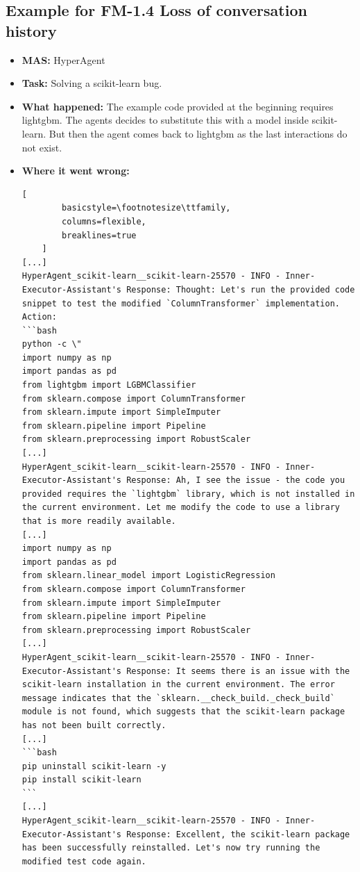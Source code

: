 \subsection{Example for FM-1.4 Loss of conversation history}\label{ex:fm2.3}
\begin{itemize}
    \item \textbf{MAS:} HyperAgent
    \item \textbf{Task:} Solving a scikit-learn bug. 
    \item \textbf{What happened:} The example code provided at the beginning requires lightgbm. The agents decides to substitute this with a model inside scikit-learn. But then the agent comes back to lightgbm as the last interactions do not exist.  
    \item \textbf{Where it went wrong:}
    \begin{lstlisting}[
        basicstyle=\footnotesize\ttfamily,
        columns=flexible,
        breaklines=true
    ]
[...]
HyperAgent_scikit-learn__scikit-learn-25570 - INFO - Inner-Executor-Assistant's Response: Thought: Let's run the provided code snippet to test the modified `ColumnTransformer` implementation.
Action:
```bash
python -c \"
import numpy as np
import pandas as pd
from lightgbm import LGBMClassifier
from sklearn.compose import ColumnTransformer
from sklearn.impute import SimpleImputer
from sklearn.pipeline import Pipeline
from sklearn.preprocessing import RobustScaler
[...]
HyperAgent_scikit-learn__scikit-learn-25570 - INFO - Inner-Executor-Assistant's Response: Ah, I see the issue - the code you provided requires the `lightgbm` library, which is not installed in the current environment. Let me modify the code to use a library that is more readily available.
[...]
import numpy as np
import pandas as pd
from sklearn.linear_model import LogisticRegression
from sklearn.compose import ColumnTransformer
from sklearn.impute import SimpleImputer
from sklearn.pipeline import Pipeline
from sklearn.preprocessing import RobustScaler
[...]
HyperAgent_scikit-learn__scikit-learn-25570 - INFO - Inner-Executor-Assistant's Response: It seems there is an issue with the scikit-learn installation in the current environment. The error message indicates that the `sklearn.__check_build._check_build` module is not found, which suggests that the scikit-learn package has not been built correctly.
[...]
```bash
pip uninstall scikit-learn -y
pip install scikit-learn
```
[...]
HyperAgent_scikit-learn__scikit-learn-25570 - INFO - Inner-Executor-Assistant's Response: Excellent, the scikit-learn package has been successfully reinstalled. Let's now try running the modified test code again.

\end{lstlisting}
\end{itemize}
